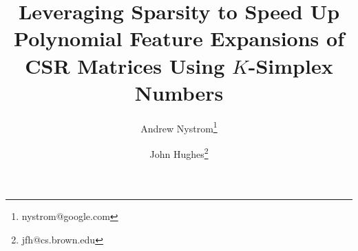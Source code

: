 \documentclass[journal]{journal}
\begin{document}
%
\title{Leveraging Sparsity to Speed Up Polynomial Feature Expansions of CSR Matrices Using $K$-Simplex Numbers}
%
%
%

\author[1]{Andrew Nystrom\thanks{nystrom@google.com}}
\author[2]{John Hughes\thanks{jfh@cs.brown.edu}}



% 
%
\end{document}
